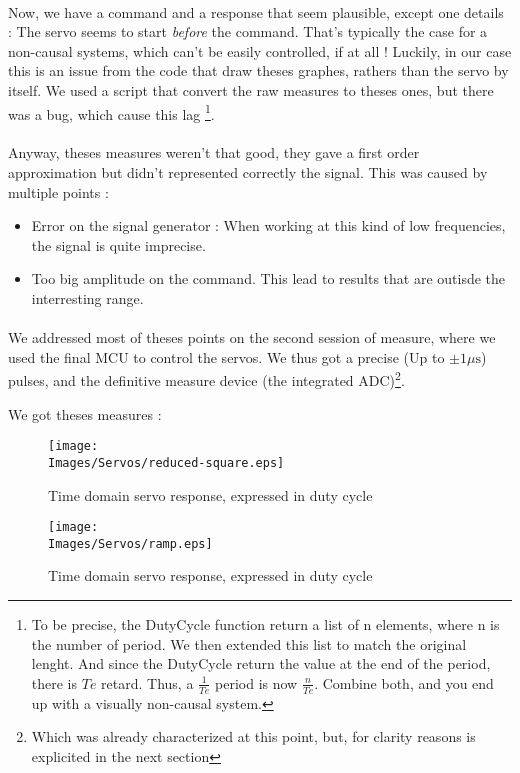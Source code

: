 \paragraph{}
Now, we have a command and a response that seem plausible, except one details : The servo seems to start
\textit{before} the command. That's typically the case for a non-causal systems, which can't be easily controlled,
if at all !
Luckily, in our case this is an issue from the code that draw theses graphes, rathers than the servo by itself.
We used a script that convert the raw measures to theses ones, but there was a bug, which cause this lag \footnote{
    To be precise, the DutyCycle function return a list of n elements, where n is the number of period. We then
    extended this list to match the original lenght. And since the DutyCycle return the value at the end of the
    period, there is $Te$ retard. Thus, a $\frac{1}{Te}$ period is now $\frac{n}{Te}$.
    Combine both, and you end up with a visually non-causal system.
}.

\paragraph{}
Anyway, theses measures weren't that good, they gave a first order approximation but didn't represented
correctly the signal. This was caused by multiple points :

\begin{itemize}
    \item Error on the signal generator : When working at this kind of low frequencies, the signal is quite imprecise.
    \item Too big amplitude on the command. This lead to results that are outisde the interresting range.
\end{itemize}

\paragraph{}
We addressed most of theses points on the second session of measure, where we used the final MCU to control the servos.
We thus got a precise (Up to $\pm 1 \si{\mu\second}$) pulses, and the definitive measure device (the integrated ADC)\footnote{
    Which was already characterized at this point, but, for clarity reasons is explicited in the next section
}.

We got theses measures :

\begin{figure}[!hbt]
    \centering
    \texttt{[image: \\Images/Servos/reduced-square.eps]}
    \caption{Time domain servo response, expressed in duty cycle}
\end{figure}
\begin{figure}[!hbt]
    \centering
    \texttt{[image: \\Images/Servos/ramp.eps]}
    \caption{Time domain servo response, expressed in duty cycle}
\end{figure}
\FloatBarrier

